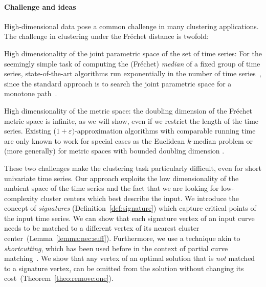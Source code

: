 \documentclass[11pt, letter]{article}
\newcommand{\thmref}[1]{Theorem~\ref{theo:#1}}
\newcommand{\lemref}[1]{Lemma~\ref{lemma:#1}}
\newcommand{\defref}[1]{Definition~\ref{def:#1}}
\newcommand{\Frechet}{Fr\'echet\xspace}
\providecommand{\eps}{{\varepsilon}}\newcommand{\Astop}{\overline{a}}
\begin{document}
\paragraph{Challenge and ideas}
High-dimensional data pose a common challenge in many clustering applications.
The challenge in clustering under the \Frechet distance is twofold:
\begin{compactenum}[(A)]
\item High dimensionality of the joint parametric
space of the set of time series:  For the seemingly simple task of computing the (\Frechet{})
\emph{median} of a fixed group of time series, state-of-the-art algorithms run
exponentially in the number of time series~\cite{ahn2015middle, hr-fdre-14}, since the standard
approach is to search the joint parametric space for a monotone 
path~\cite{ag-cfdbt-95, akw-mpcfd-10,buchin2012four, bbw-eapcm-09, feldman2012gps, GudVahr12,
hr-fdre-14, mssz-fdsl-2011}. 
\item High dimensionality of the metric space: the doubling dimension of the \Frechet metric space is
infinite, as we will show, even if we restrict the length of the time series.
Existing ($1+\eps)$-approximation algorithms \cite{abs-cm-10, kumar2010lineartime} with comparable running time are only known to work for special cases
as the Euclidean $k$-median problem or (more generally) for metric spaces with bounded doubling dimension 
\cite{abs-cm-10}.
\end{compactenum}
These two challenges make the clustering task particularly difficult, even for short univariate time
series. Our approach exploits the low dimensionality of the ambient space of the
time series and the fact that we are looking for low-complexity cluster 
centers which best describe the input. 
We introduce the concept of \emph{signatures} (\defref{signature}) which capture critical points of
the input time series. We can show that each signature vertex of an input curve
needs to be matched to a different vertex of its nearest cluster center~(\lemref{nec:suff}).  
Furthermore, we use a technique akin to \emph{shortcutting}, which has been used
before in the context of partial curve matching~\cite{bbw-eapcm-09, dh-jydfd-13}.
We show that any vertex of an optimal solution that is \emph{not} matched to a
signature vertex, can be omitted from the solution without changing its
cost~(\thmref{remove:one}).
\end{document}
